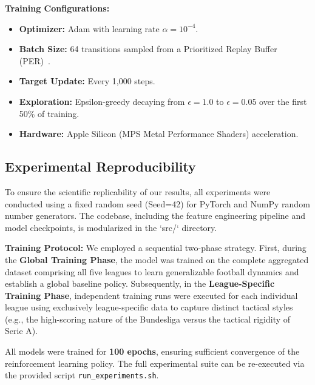 \documentclass[3p,times,procedia]{elsarticle}
\begin{document}
\textbf{Training Configurations:}

\begin{itemize}
    \item \textbf{Optimizer:} Adam with learning rate $\alpha = 10^{-4}$.
    \item \textbf{Batch Size:} 64 transitions sampled from a Prioritized Replay Buffer (PER)~\cite{mnih2015human}.
    \item \textbf{Target Update:} Every 1,000 steps.
    \item \textbf{Exploration:} Epsilon-greedy decaying from $\epsilon=1.0$ to $\epsilon=0.05$ over the first 50\% of training.
    \item \textbf{Hardware:} Apple Silicon (MPS Metal Performance Shaders) acceleration.
\end{itemize}

\subsection{Experimental Reproducibility}
To ensure the scientific replicability of our results, all experiments were conducted using a fixed random seed (Seed=42) for PyTorch and NumPy random number generators. The codebase, including the feature engineering pipeline and model checkpoints, is modularized in the `src/` directory.

\textbf{Training Protocol:} We employed a sequential two-phase strategy. First, during the \textbf{Global Training Phase}, the model was trained on the complete aggregated dataset comprising all five leagues to learn generalizable football dynamics and establish a global baseline policy. Subsequently, in the \textbf{League-Specific Training Phase}, independent training runs were executed for each individual league using exclusively league-specific data to capture distinct tactical styles (e.g., the high-scoring nature of the Bundesliga versus the tactical rigidity of Serie A).

All models were trained for \textbf{100 epochs}, ensuring sufficient convergence of the reinforcement learning policy. The full experimental suite can be re-executed via the provided script \texttt{run\_experiments.sh}.
\end{document}
